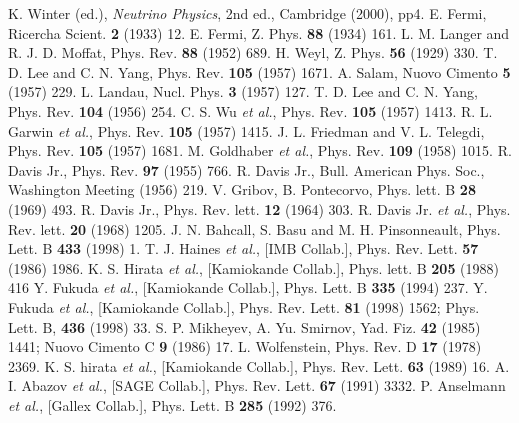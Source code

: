 \begin{thebibliography}{99}
K. Winter (ed.), \emph{Neutrino Physics}, 2nd ed.,   Cambridge (2000), pp4.
E. Fermi, Ricercha Scient. \textbf{2} (1933) 12.
E. Fermi, Z. Phys. \textbf{88} (1934) 161.
L. M. Langer and R. J. D. Moffat, Phys. Rev.   \textbf{88} (1952) 689.
H. Weyl, Z. Phys. \textbf{56} (1929) 330.
T. D. Lee and C. N. Yang, Phys. Rev. \textbf{105}   (1957) 1671.
A. Salam, Nuovo Cimento \textbf{5} (1957) 229.
L. Landau, Nucl. Phys. \textbf{3} (1957) 127.
T. D. Lee and C. N. Yang, Phys. Rev. \textbf{104}   (1956) 254.
C. S. Wu \textit{et al.}, Phys. Rev. \textbf{105} (1957)   1413.
R. L. Garwin \textit{et al.}, Phys. Rev. \textbf{105}   (1957) 1415.
J. L. Friedman and V. L. Telegdi, Phys. Rev.   \textbf{105} (1957) 1681.
M. Goldhaber \textit{et al.}, Phys. Rev. \textbf{109}   (1958) 1015.
R. Davis Jr., Phys. Rev. \textbf{97} (1955) 766.
R. Davis Jr., Bull. American Phys. Soc., Washington   Meeting (1956) 219.
V. Gribov, B. Pontecorvo, Phys. lett. B \textbf{28}   (1969) 493.
R. Davis Jr., Phys. Rev. lett. \textbf{12} (1964) 303.
R. Davis Jr. \textit{et al.}, Phys. Rev. lett.   \textbf{20} (1968) 1205.
J. N. Bahcall, S. Basu and M. H. Pinsonneault, Phys.   Lett. B \textbf{433} (1998) 1.
T. J. Haines \textit{et al.}, [IMB Collab.], Phys. Rev.   Lett. \textbf{57} (1986) 1986.
K. S. Hirata \textit{et al.}, [Kamiokande Collab.],   Phys. lett. B \textbf{205} (1988) 416
Y. Fukuda \textit{et al.}, [Kamiokande Collab.], Phys.   Lett. B \textbf{335} (1994) 237.
Y. Fukuda \textit{et al.}, [Kamiokande Collab.], Phys.   Rev. Lett. \textbf{81} (1998) 1562; Phys. Lett. B, \textbf{436}   (1998) 33.
S. P. Mikheyev, A. Yu. Smirnov, Yad. Fiz. \textbf{42}   (1985) 1441; Nuovo Cimento C \textbf{9} (1986) 17.
L. Wolfenstein, Phys. Rev. D \textbf{17} (1978) 2369.
K. S. hirata \textit{et al.}, [Kamiokande Collab.],   Phys. Rev. Lett. \textbf{63} (1989) 16.
A. I. Abazov \textit{et al.}, [SAGE Collab.], Phys.   Rev. Lett. \textbf{67} (1991) 3332.
P. Anselmann \textit{et al.}, [Gallex Collab.], Phys.   Lett. B \textbf{285} (1992) 376.

\end{thebibliography}
